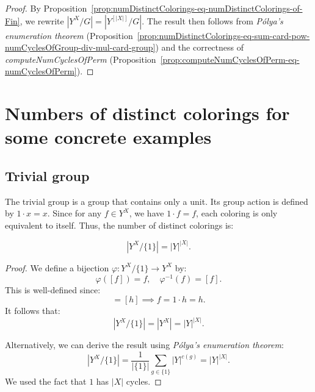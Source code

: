 \begin{proof}
  \leanok
  By Proposition~\ref{prop:numDistinctColorings-eq-numDistinctColorings-of-Fin}, we rewrite $|Y^X/G| = |Y^{[|X|]}/G|$. The result then follows from \emph{Pólya's enumeration theorem} (Proposition~\ref{prop:numDistinctColorings-eq-sum-card-pow-numCyclesOfGroup-div-mul-card-group}) and the correctness of \emph{computeNumCyclesOfPerm} (Proposition~\ref{prop:computeNumCyclesOfPerm-eq-numCyclesOfPerm}).
\end{proof}

\section{Numbers of distinct colorings for some concrete examples}

\subsection{Trivial group}

The trivial group is a group that contains only a unit. Its group action is defined by $1 \cdot x = x$. Since for any $f \in Y^X$, we have $1 \cdot f = f$, each coloring is only equivalent to itself. Thus, the number of distinct colorings is:

\begin{proposition}
  \label{def:numDistinctColoringsOfTrivialGroup}
  \leanok
  \begin{equation*}
    |Y^X / \{1\}| = |Y|^{|X|}.
  \end{equation*}
\end{proposition}

\begin{proof}
  \leanok
  We define a bijection $\varphi : Y^X/\{1\} \to Y^X$ by:
  \begin{equation*}
    \varphi([f]) = f, \quad \varphi^{-1}(f) = [f].
  \end{equation*}
  This is well-defined since:
  \begin{equation*}
    [f] = [h] \implies f = 1 \cdot h = h.
  \end{equation*}
  It follows that:
  \begin{equation*}
    |Y^X/\{1\}| = |Y^X| = |Y|^{|X|}.
  \end{equation*}

  Alternatively, we can derive the result using \emph{Pólya's enumeration theorem}:
  \begin{equation*}
    |Y^X/\{1\}| = \frac{1}{|\{1\}|} \sum_{g \in \{1\}} |Y|^{c(g)} = |Y|^{|X|}.
  \end{equation*}
  We used the fact that $1$ has $|X|$ cycles.
\end{proof}

